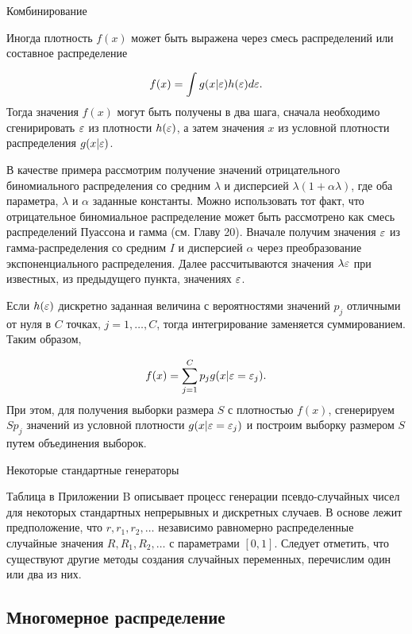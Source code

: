 \begin{center}
Комбинирование
\end{center}



Иногда плотность $f(x)$ может быть выражена через смесь распределений или составное распределение

\[
f(x)=\int{g(x|\varepsilon)h(\varepsilon)d\varepsilon}.
\]
Тогда значения $f(x)$ могут быть получены в два шага, сначала необходимо сгенирировать $\varepsilon$ из плотности $h(\varepsilon)$, а затем значения $x$ из условной плотности распределения $g(x|\varepsilon)$.

В качестве примера рассмотрим получение значений отрицательного биномиального распределения со средним $\lambda$ и дисперсией $\lambda(1+\alpha\lambda)$, где оба параметра, $\lambda$ и $\alpha$ заданные константы. Можно использовать тот факт, что отрицательное биномиальное распределение может быть рассмотрено как смесь распределений Пуассона и гамма (см. Главу 20). Вначале получим значения $\varepsilon$ из гамма-распределения со средним $I$ и дисперсией $\alpha$ через преобразование экспоненциального распределения. Далее рассчитываются значения $\lambda\varepsilon$ при известных, из предыдущего пункта, значениях $\varepsilon$.

Если $h(\varepsilon)$ дискретно заданная величина с вероятностями значений $p_j$ отличными от нуля в $C$ точках, $j=1,\ldots ,C$, тогда интегрирование заменяется суммированием. Таким образом,

\[
f(x)=\sum^{C}_{j=1}p_{j}g(x|\varepsilon=\varepsilon_{j}).
\]
При этом, для получения выборки размера $S$ с плотностью $f(x)$, сгенерируем $Sp_j$ значений из условной плотности $g(x|\varepsilon=\varepsilon_j)$ и построим выборку размером $S$ путем объединения выборок.

\begin{center}
Некоторые стандартные генераторы
\end{center}

Таблица в Приложении B описывает процесс генерации псевдо-случайных чисел для некоторых стандартных непрерывных и дискретных случаев. В основе лежит предположение, что $r,r_1,r_2,\ldots $ независимо равномерно распределенные случайные значения $R,R_1,R_2,\ldots $ с параметрами $[0,1]$. Следует отметить, что существуют другие методы создания случайных переменных, перечислим один или два из них.

\subsection{Многомерное распределение}

